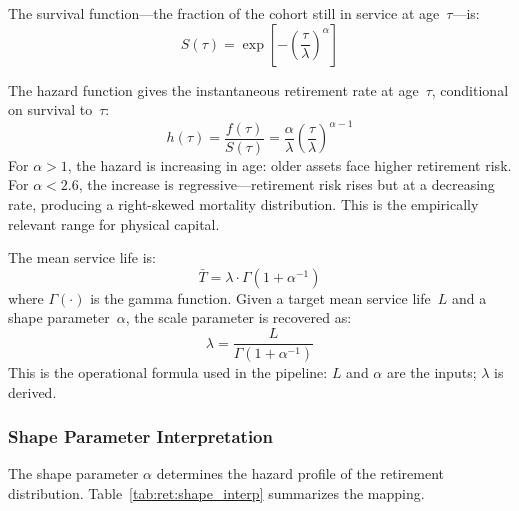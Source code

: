 The survival function---the fraction of the cohort still in service at
age~$\tau$---is:
%
\begin{equation}
    S(\tau) = \exp\!\left[-\left(\frac{\tau}{\lambda}\right)^{\!\alpha}\right]
    \label{eq:ret:survival}
\end{equation}

The hazard function gives the instantaneous retirement rate at age~$\tau$,
conditional on survival to~$\tau$:
%
\begin{equation}
    h(\tau) = \frac{f(\tau)}{S(\tau)}
    = \frac{\alpha}{\lambda}
    \left(\frac{\tau}{\lambda}\right)^{\alpha - 1}
    \label{eq:ret:hazard}
\end{equation}
%
For $\alpha > 1$, the hazard is increasing in age: older assets face higher
retirement risk. For $\alpha < 2.6$, the increase is regressive---retirement
risk rises but at a decreasing rate, producing a right-skewed mortality
distribution. This is the empirically relevant range for physical capital.

The mean service life is:
%
\begin{equation}
    \bar{T} = \lambda \cdot \Gamma\!\left(1 + \alpha^{-1}\right)
    \label{eq:ret:mean_life}
\end{equation}
%
where $\Gamma(\cdot)$ is the gamma function. Given a target mean service
life~$L$ and a shape parameter~$\alpha$, the scale parameter is recovered as:
%
\begin{equation}
    \lambda = \frac{L}{\Gamma(1 + \alpha^{-1})}
    \label{eq:ret:lambda_from_L}
\end{equation}
%
This is the operational formula used in the pipeline: $L$ and $\alpha$ are the
inputs; $\lambda$ is derived.


\subsubsection{Shape Parameter Interpretation}
\label{app:ret:shape_interp}

The shape parameter $\alpha$ determines the hazard profile of the retirement
distribution. Table~\ref{tab:ret:shape_interp} summarizes the mapping.

